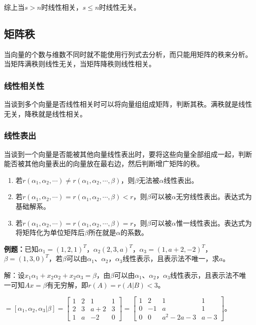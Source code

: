 \documentclass[UTF8, 12pt]{ctexart}
\begin{document}
综上当$s>n$时线性相关，$s\leqslant n$时线性无关。

\subsection{矩阵秩}

当向量的个数与维数不同时就不能使用行列式去分析，而只能用矩阵的秩来分析。当矩阵满秩则线性无关，当矩阵降秩则线性相关。

\subsubsection{线性相关性}

当谈到多个向量是否线性相关时可以将向量组组成矩阵，判断其秩。满秩就是线性无关，降秩就是线性相关。

\subsubsection{线性表出}

当谈到一个向量是否能被其他向量线性表出时，要将这些向量全部组成一起，判断能否被其他向量表出的向量放在最右边，然后判断增广矩阵的秩。

\begin{enumerate}
    \item 若$r(\alpha_1,\alpha_2,\cdots)\neq r(\alpha_1,\alpha_2,\cdots,\beta)$，则$\beta$无法被$\alpha$线性表出。
    \item 若$r(\alpha_1,\alpha_2,\cdots)=r(\alpha_1,\alpha_2,\cdots,\beta)<r$，则$\beta$可以被$\alpha$无穷线性表出。表达式为基础解系。
    \item 若$r(\alpha_1,\alpha_2,\cdots)=r(\alpha_1,\alpha_2,\cdots,\beta)=r$，则$\beta$可以被$\alpha$惟一线性表出。表达式为将矩阵化为单位矩阵后$\beta$所在就是$\alpha$的系数。
\end{enumerate}

\textbf{例题：}已知$\alpha_1=(1,2,1)^T$，$\alpha_2(2,3,a)^T$，$\alpha_3=(1,a+2,-2)^T$，$\beta=(1,3,0)^T$，若$\beta$可以由$\alpha_1$、$\alpha_2$，$\alpha_3$线性表示，且表示法不唯一，求$a$。

解：设$x_1\alpha_1+x_2\alpha_2+x_2\alpha_3=\beta$，由$\beta$可以由$\alpha_1$、$\alpha_2$，$\alpha_3$线性表示，且表示法不唯一可知$Ax=\beta$有无穷解，即$r(A)=r(A|B)<3$。

$=[\alpha_1,\alpha_2,\alpha_3|\beta]=\left[\begin{array}{cccc}
    1 & 2 & 1 & 1 \\
    2 & 3 & a+2 & 3 \\
    1 & a & -2 & 0
\end{array}\right]=\left[\begin{array}{cccc}
    1 & 2 & 1 & 1 \\
    0 & -1 & a & 1 \\
    0 & 0 & a^2-2a-3 & a-3
\end{array}\right]$。
\end{document}
